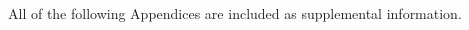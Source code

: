\documentclass[12pt]{article}
\begin{document}
\begin{spacing}{2.0}

All of the following Appendices are included as supplemental information.

    
    
        
    
        
        
        

\end{spacing}
\end{document}
